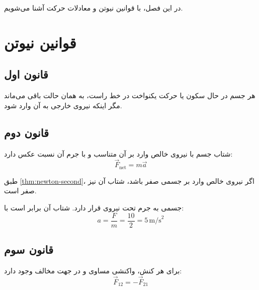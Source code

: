 در این فصل، با قوانین نیوتن و معادلات
حرکت آشنا می‌شویم.


\section{قوانین نیوتن}
\label{sec:physics-book-newton}

\subsection{قانون اول}
\label{sec:physics-book-newton-first}

\begin{theorem}
    هر جسم در حال سکون یا حرکت یکنواخت
    در خط راست، به همان حالت باقی می‌ماند
    مگر اینکه نیروی خارجی به آن وارد شود.
    \label{thm:newton-first}
\end{theorem}


\subsection{قانون دوم}
\label{sec:physics-book-newton-second}

\begin{theorem}
    شتاب جسم با نیروی خالص وارد بر آن
    متناسب و با جرم آن نسبت عکس دارد:
    \[
        \vec{F}_{\text{net}} = m \vec{a}
    \]
    \label{thm:newton-second}
\end{theorem}

طبق \cref{thm:newton-second}، اگر نیروی
خالص وارد بر جسمی صفر باشد، شتاب آن نیز
صفر است.

\begin{example}
    جسمی به جرم  تحت
    نیروی  قرار دارد.
    شتاب آن برابر است با:
    \[
        a = \frac{F}{m} = \frac{10}{2} = 5\,\text{m/s}^2
    \]
    \label{ex:newton-second}
\end{example}

\subsection{قانون سوم}
\label{sec:physics-book-newton-third}

\begin{theorem}
    برای هر کنش، واکنشی مساوی و در جهت
    مخالف وجود دارد:
    \[
        \vec{F}_{12} = -\vec{F}_{21}
    \]
    \label{thm:newton-third}
\end{theorem}

